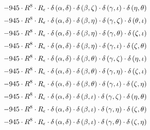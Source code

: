 \begin{subequations}
\begin{gather}
 \\[0.2em] \notag 		 - 945 \cdot R^{8} \cdot R_{\epsilon{}} \cdot \delta{}\left(\alpha{}, \delta{}\right) \cdot \delta{}\left(\beta{}, \zeta{}\right) \cdot \delta{}\left(\gamma{}, \iota{}\right) \cdot \delta{}\left(\eta{}, \theta{}\right) 
 \\[0.2em] \notag 		 - 945 \cdot R^{8} \cdot R_{\epsilon{}} \cdot \delta{}\left(\alpha{}, \delta{}\right) \cdot \delta{}\left(\beta{}, \eta{}\right) \cdot \delta{}\left(\gamma{}, \zeta{}\right) \cdot \delta{}\left(\theta{}, \iota{}\right) 
 \\[0.2em] \notag 		 - 945 \cdot R^{8} \cdot R_{\epsilon{}} \cdot \delta{}\left(\alpha{}, \delta{}\right) \cdot \delta{}\left(\beta{}, \eta{}\right) \cdot \delta{}\left(\gamma{}, \theta{}\right) \cdot \delta{}\left(\zeta{}, \iota{}\right) 
 \\[0.2em] \notag 		 - 945 \cdot R^{8} \cdot R_{\epsilon{}} \cdot \delta{}\left(\alpha{}, \delta{}\right) \cdot \delta{}\left(\beta{}, \eta{}\right) \cdot \delta{}\left(\gamma{}, \iota{}\right) \cdot \delta{}\left(\zeta{}, \theta{}\right) 
 \\[0.2em] \notag 		 - 945 \cdot R^{8} \cdot R_{\epsilon{}} \cdot \delta{}\left(\alpha{}, \delta{}\right) \cdot \delta{}\left(\beta{}, \theta{}\right) \cdot \delta{}\left(\gamma{}, \zeta{}\right) \cdot \delta{}\left(\eta{}, \iota{}\right) 
 \\[0.2em] \notag 		 - 945 \cdot R^{8} \cdot R_{\epsilon{}} \cdot \delta{}\left(\alpha{}, \delta{}\right) \cdot \delta{}\left(\beta{}, \theta{}\right) \cdot \delta{}\left(\gamma{}, \eta{}\right) \cdot \delta{}\left(\zeta{}, \iota{}\right) 
 \\[0.2em] \notag 		 - 945 \cdot R^{8} \cdot R_{\epsilon{}} \cdot \delta{}\left(\alpha{}, \delta{}\right) \cdot \delta{}\left(\beta{}, \theta{}\right) \cdot \delta{}\left(\gamma{}, \iota{}\right) \cdot \delta{}\left(\zeta{}, \eta{}\right) 
 \\[0.2em] \notag 		 - 945 \cdot R^{8} \cdot R_{\epsilon{}} \cdot \delta{}\left(\alpha{}, \delta{}\right) \cdot \delta{}\left(\beta{}, \iota{}\right) \cdot \delta{}\left(\gamma{}, \zeta{}\right) \cdot \delta{}\left(\eta{}, \theta{}\right) 
 \\[0.2em] \notag 		 - 945 \cdot R^{8} \cdot R_{\epsilon{}} \cdot \delta{}\left(\alpha{}, \delta{}\right) \cdot \delta{}\left(\beta{}, \iota{}\right) \cdot \delta{}\left(\gamma{}, \eta{}\right) \cdot \delta{}\left(\zeta{}, \theta{}\right) 
 \\[0.2em] \notag 		 - 945 \cdot R^{8} \cdot R_{\epsilon{}} \cdot \delta{}\left(\alpha{}, \delta{}\right) \cdot \delta{}\left(\beta{}, \iota{}\right) \cdot \delta{}\left(\gamma{}, \theta{}\right) \cdot \delta{}\left(\zeta{}, \eta{}\right) 

\end{gather}
\end{subequations}
